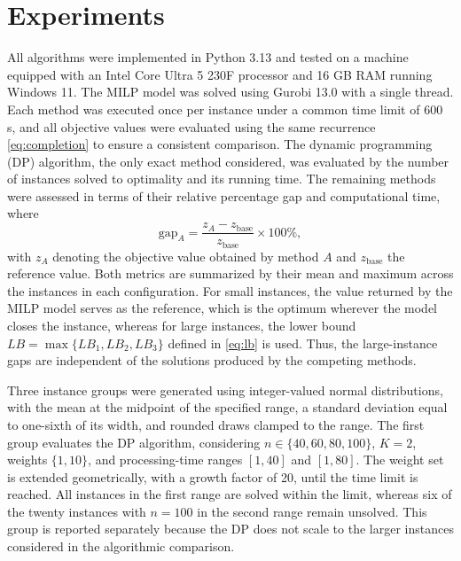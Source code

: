 ﻿\documentclass[12pt]{article}
\let\origsection\section
\renewcommand{\section}{\FloatBarrier\origsection}
\begin{document}
\begin{sloppypar}
\section{Experiments}
\label{sec:experiments}

All algorithms were implemented in Python 3.13 and tested on a machine equipped with an Intel Core Ultra 5 230F processor
 and 16 GB RAM running Windows 11. The MILP model was solved using Gurobi 13.0 with a single thread. 
 Each method was executed once per instance under a common time limit of 600 s, and all objective values were 
 evaluated using the same recurrence \cref{eq:completion} to ensure a consistent comparison. 
 The dynamic programming (DP) algorithm, the only exact method considered, was evaluated by the number of instances 
 solved to optimality and its running time. The remaining methods were assessed in terms of their relative percentage 
 gap and computational time, where
\begin{equation}\label{eq:gap}
\text{gap}_A = \frac{z_A-z_{\text{base}}}{z_{\text{base}}}\times 100\%,
\end{equation}
with \(z_A\) denoting the objective value obtained by method \(A\) and \(z_{\text{base}}\) the reference value. 
Both metrics are summarized by their mean and maximum across the instances in each configuration. For small instances, 
the value returned by the MILP model serves as the reference, which is the optimum wherever the model closes the instance, 
whereas for large instances, the lower bound \(LB=\max\{LB_1,LB_2,LB_3\}\) defined in \cref{eq:lb} is used. 
Thus, the large-instance gaps are independent of the solutions produced by the competing methods.

Three instance groups were generated using integer-valued normal distributions, with the mean at the midpoint of 
the specified range, a standard deviation equal to one-sixth of its width, and rounded draws clamped to the range. 
The first group evaluates the DP algorithm, considering \(n\in\{40,60,80,100\}\), \(K=2\), weights \(\{1,10\}\), 
and processing-time ranges \([1,40]\) and \([1,80]\). The weight set is extended geometrically, 
with a growth factor of 20, until the time limit is reached. All instances in the first range are solved within the limit, 
whereas six of the twenty instances with \(n=100\) in the second range remain unsolved. 
This group is reported separately because the DP does not scale to the larger instances considered in the algorithmic comparison.


\end{sloppypar}
\end{document}

